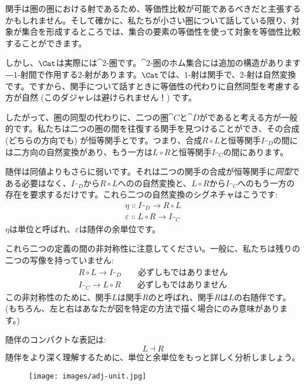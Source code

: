 関手は圏の圏における射であるため、等価性比較が可能であるべきだと主張するかもしれません。そして確かに、私たちが小さい圏について話している限り、対象が集合を形成するところでは、集合の要素の等価性を使って対象を等価性比較することができます。

しかし、$\Cat$は実際には$\cat{2}$-圏です。$\cat{2}$-圏のホム集合には追加の構造があります―$1$-射間で作用する$2$-射があります。$\Cat$では、$1$-射は関手で、$2$-射は自然変換です。ですから、関手について話すときに等価性の代わりに自然同型を考慮する方が自然 (このダジャレは避けられません！) です。

したがって、圏の同型の代わりに、二つの圏$\cat{C}$と$\cat{D}$がであると考える方が一般的です。私たちは二つの圏の間を往復する関手を見つけることができ、その合成 (どちらの方向でも) が恒等関手とです。つまり、合成$R \circ L$と恒等関手$I_{\cat{D}}$の間には二方向の自然変換があり、もう一方は$L \circ R$と恒等関手$I_{\cat{C}}$の間にあります。

随伴は同値よりもさらに弱いです。それは二つの関手の合成が恒等関手に\emph{同型}である必要はなく、$I_{\cat{D}}$から$R \circ L$へのの自然変換と、$L \circ R$から$I_{\cat{C}}$へのもう一方の存在を要求するだけです。これら二つの自然変換のシグネチャはこうです: 
\begin{gather*}
  \eta \Colon I_{\cat{D}} \to R \circ L \\
  \varepsilon \Colon L \circ R \to I_{\cat{C}}
\end{gather*}
$\eta$は単位と呼ばれ、$\varepsilon$は随伴の余単位です。

これら二つの定義の間の非対称性に注意してください。一般に、私たちは残りの二つの写像を持っていません: 
\begin{gather*}
  R \circ L \to I_{\cat{D}} \quad\quad\text{必ずしもではありません} \\
  I_{\cat{C}} \to L \circ R \quad\quad\text{必ずしもではありません}
\end{gather*}
この非対称性のために、関手$L$は関手$R$のと呼ばれ、関手$R$は$L$の右随伴です。 (もちろん、左と右はあなたが図を特定の方法で描く場合にのみ意味があります。) 

随伴のコンパクトな表記は: 
\[L \dashv R\]
随伴をより深く理解するために、単位と余単位をもっと詳しく分析しましょう。

\begin{figure}[H]
  \centering
  \texttt{[image: images/adj-unit.jpg]}
\end{figure}

